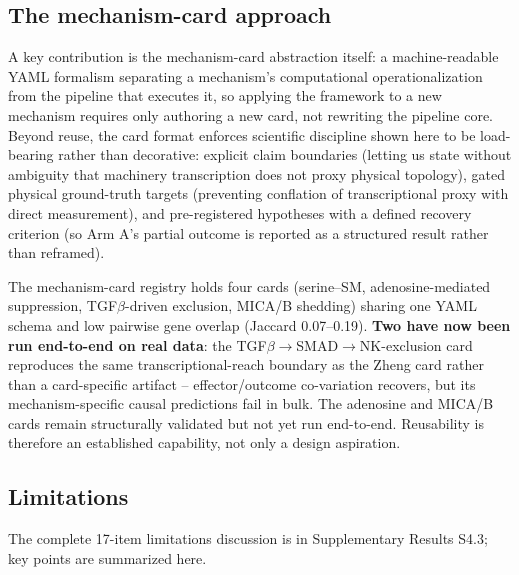 \documentclass[modern,large,numbered,nocrop]{oup-authoring-template}
\begin{document}
\subsection{The mechanism-card approach}

A key contribution is the mechanism-card abstraction itself: a machine-readable YAML formalism separating a mechanism's computational operationalization from the pipeline that executes it, so applying the framework to a new mechanism requires only authoring a new card, not rewriting the pipeline core. Beyond reuse, the card format enforces scientific discipline shown here to be load-bearing rather than decorative: explicit claim boundaries (letting us state without ambiguity that machinery transcription does not proxy physical topology), gated physical ground-truth targets (preventing conflation of transcriptional proxy with direct measurement), and pre-registered hypotheses with a defined recovery criterion (so Arm A's partial outcome is reported as a structured result rather than reframed).

The mechanism-card registry holds four cards (serine--SM, adenosine-mediated suppression, TGF$\beta$-driven exclusion, MICA/B shedding) sharing one YAML schema and low pairwise gene overlap (Jaccard 0.07--0.19). \textbf{Two have now been run end-to-end on real data}: the TGF$\beta$$\to$SMAD$\to$NK-exclusion card reproduces the same transcriptional-reach boundary as the Zheng card rather than a card-specific artifact -- effector/outcome co-variation recovers, but its mechanism-specific causal predictions fail in bulk. The adenosine and MICA/B cards remain structurally validated but not yet run end-to-end. Reusability is therefore an established capability, not only a design aspiration.

\subsection{Limitations}

The complete 17-item limitations discussion is in Supplementary Results S4.3; key points are summarized here.
\end{document}
